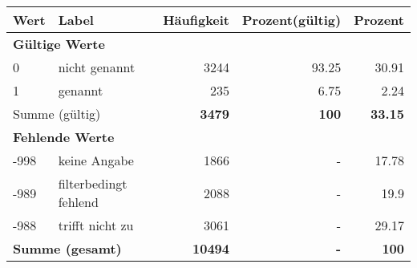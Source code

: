      \begin{longtable}{lXrrr}
     \toprule
     \textbf{Wert} & \textbf{Label} & \textbf{Häufigkeit} & \textbf{Prozent(gültig)} & \textbf{Prozent} \\
     \endhead
     \midrule
     \multicolumn{5}{l}{\textbf{Gültige Werte}}\\

     0 &
     \multicolumn{1}{X}{ nicht genannt   } &


       \num{3244} &
       \num[round-mode=places,round-precision=2]{93,25} &
         \num[round-mode=places,round-precision=2]{30,91} \\

     1 &
     \multicolumn{1}{X}{ genannt   } &


       \num{235} &
       \num[round-mode=places,round-precision=2]{6,75} &
         \num[round-mode=places,round-precision=2]{2,24} \\
     \midrule
     \multicolumn{2}{l}{Summe (gültig)} &
       \textbf{\num{3479}} &
     \textbf{100} &
       \textbf{\num[round-mode=places,round-precision=2]{33,15}} \\
     \multicolumn{5}{l}{\textbf{Fehlende Werte}}\\
       -998 &
       keine Angabe &
         \num{1866} &
        - &
         \num[round-mode=places,round-precision=2]{17,78} \\
       -989 &
       filterbedingt fehlend &
         \num{2088} &
        - &
         \num[round-mode=places,round-precision=2]{19,9} \\
       -988 &
       trifft nicht zu &
         \num{3061} &
        - &
         \num[round-mode=places,round-precision=2]{29,17} \\
     \midrule
     \multicolumn{2}{l}{\textbf{Summe (gesamt)}} &
          \textbf{\num{10494}} &
        \textbf{-} &
        \textbf{100} \\
     \bottomrule
     \end{longtable}
     
